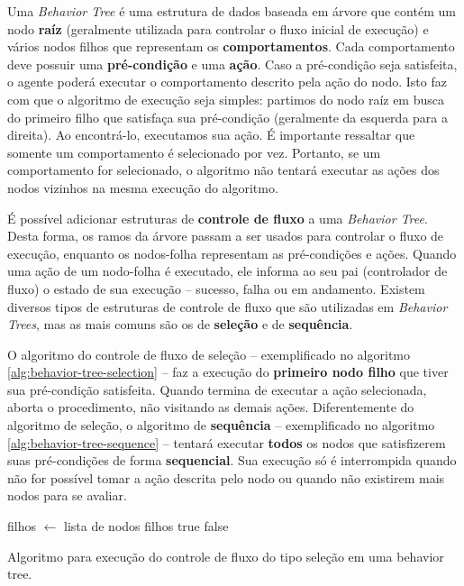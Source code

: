 Uma \textit{Behavior Tree} é uma estrutura de dados baseada em árvore que contém
um nodo \textbf{raíz} (geralmente utilizada para controlar o fluxo inicial de
execução) e vários nodos filhos que representam os \textbf{comportamentos}. Cada
comportamento deve possuir uma \textbf{pré-condição} e uma \textbf{ação}. Caso a
pré-condição seja satisfeita, o agente poderá executar o comportamento descrito
pela ação do nodo\cite[Cap. 4]{Rabin:2013:GAP:256671}. Isto faz com que o
algoritmo de execução seja simples: partimos do nodo raíz em busca do primeiro
filho que satisfaça sua pré-condição (geralmente da esquerda para a direita). Ao
encontrá-lo, executamos sua ação. É importante ressaltar que somente um
comportamento é selecionado por vez. Portanto, se um comportamento for
selecionado, o algoritmo não tentará executar as ações dos nodos vizinhos na
mesma execução do algoritmo.

É possível adicionar estruturas de \textbf{controle de fluxo} a uma
\textit{Behavior Tree}. Desta forma, os ramos da árvore passam a ser usados para
controlar o fluxo de execução, enquanto os nodos-folha representam as
pré-condições e ações\cite[Cap. 10]{Rabin:2015:GAP:2821138}. Quando uma ação de
um nodo-folha é executado, ele informa ao seu pai (controlador de fluxo) o
estado de sua execução -- sucesso, falha ou em andamento. Existem diversos
tipos de estruturas de controle de fluxo que são utilizadas em \textit{Behavior
Trees}, mas as mais comuns são os de \textbf{seleção} e de \textbf{sequência}.

O algoritmo do controle de fluxo de seleção -- exemplificado no algoritmo
\ref{alg:behavior-tree-selection} -- faz a execução do \textbf{primeiro nodo
filho} que tiver sua pré-condição satisfeita. Quando termina de executar a ação
selecionada, aborta o procedimento, não visitando as demais ações.
Diferentemente do algoritmo de seleção, o algoritmo de \textbf{sequência} --
exemplificado no algoritmo \ref{alg:behavior-tree-sequence} -- tentará executar
\textbf{todos} os nodos que satisfizerem suas pré-condições de forma
\textbf{sequencial}. Sua execução só é interrompida quando não for possível
tomar a ação descrita pelo nodo ou quando não existirem mais nodos para se
avaliar.

\begin{algorithm}[H]
\begin{center}
	\begin{algorithmic}[1]
        \STATE filhos $\gets$ lista de nodos filhos
                \RETURN true
            \ENDIF
        \ENDFOR
        \RETURN false
    \end{algorithmic}
\end{center}
\caption[Algoritmo para execução do controle de fluxo do tipo seleção em uma
behavior tree.]
{\label{alg:behavior-tree-selection} Algoritmo para execução do controle de
fluxo do tipo seleção em uma behavior tree.}
\end{algorithm}

